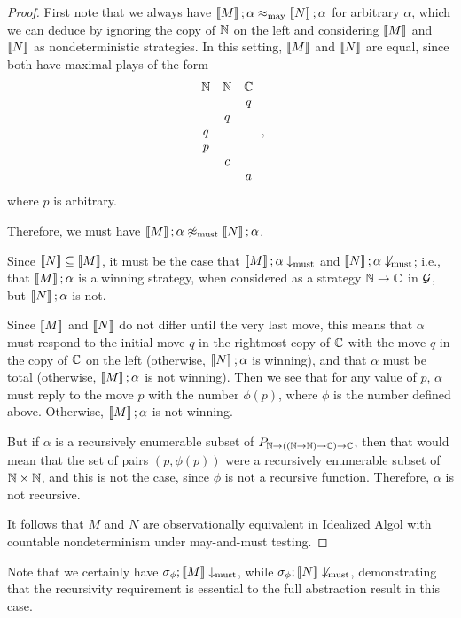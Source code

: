 \documentclass{article}
\begin{document}
\begin{proof}
  First note that we always have $\left\llbracket M\right\rrbracket;\alpha\approx_{\operatorname{may}}\left\llbracket N\right\rrbracket;\alpha$ for arbitrary $\alpha$, which we can deduce by ignoring the copy of $\mathbb{N}$ on the left and considering $\left\llbracket M\right\rrbracket$ and $\left\llbracket N\right\rrbracket$ as nondeterministic strategies.  
  In this setting, $\left\llbracket M\right\rrbracket$ and $\left\llbracket N\right\rrbracket$ are equal, since both have maximal plays of the form
  \[
    \begin{array}{ccc}
      \mathbb{N} & \mathbb{N} & \mathbb{C} \\
          &     &  q  \\
          &  q  &     \\
       q  &     &     \\
       p  &     &     \\
          &  c  &     \\
          &     & a
    \end{array}\,,
    \]
  where $p$ is arbitrary.  

  Therefore, we must have $\left\llbracket M\right\rrbracket;\alpha \not\approx_{\operatorname{must}}\left\llbracket N\right\rrbracket;\alpha$.

  Since $\left\llbracket N\right\rrbracket \subseteq \left\llbracket M\right\rrbracket$, it must be the case that $\left\llbracket M\right\rrbracket;\alpha\downarrow_{\operatorname{must}}$ and $\left\llbracket N\right\rrbracket;\alpha\not\downarrow_{\operatorname{must}}$; i.e., that $\left\llbracket M\right\rrbracket;\alpha$ is a winning strategy, when considered as a strategy $\mathbb{N} \to \mathbb{C}$ in $\mathcal G$, but $\left\llbracket N\right\rrbracket;\alpha$ is not.

  Since $\left\llbracket M\right\rrbracket$ and $\left\llbracket N\right\rrbracket$ do not differ until the very last move, this means that $\alpha$ must respond to the initial move $q$ in the rightmost copy of $\mathbb{C}$ with the move $q$ in the copy of $\mathbb{C}$ on the left (otherwise, $\left\llbracket N\right\rrbracket;\alpha$ is winning), and that $\alpha$ must be total (otherwise, $\left\llbracket M\right\rrbracket;\alpha$ is not winning).
  Then we see that for any value of $p$, $\alpha$ must reply to the move $p$ with the number $\phi(p)$, where $\phi$ is the number defined above.  
  Otherwise, $\left\llbracket M\right\rrbracket;\alpha$ is not winning.

  But if $\alpha$ is a recursively enumerable subset of $P_{\mathbb{N} \to ((\mathbb{N} \to \mathbb{N}) \to \mathbb{C}) \to \mathbb{C}}$, then that would mean that the set of pairs $(p,\phi(p))$ were a recursively enumerable subset of $\mathbb{N} \times \mathbb{N}$, and this is not the case, since $\phi$ is not a recursive function.  
  Therefore, $\alpha$ is not recursive.  

  It follows that $M$ and $N$ are observationally equivalent in Idealized Algol with countable nondeterminism under may-and-must testing.
\end{proof}

Note that we certainly have $\sigma_\phi;\left\llbracket M\right\rrbracket\downarrow_{\operatorname{must}}$, while $\sigma_\phi;\left\llbracket N\right\rrbracket\not\downarrow_{\operatorname{must}}$, demonstrating that the recursivity requirement is essential to the full abstraction result in this case.
\end{document}
